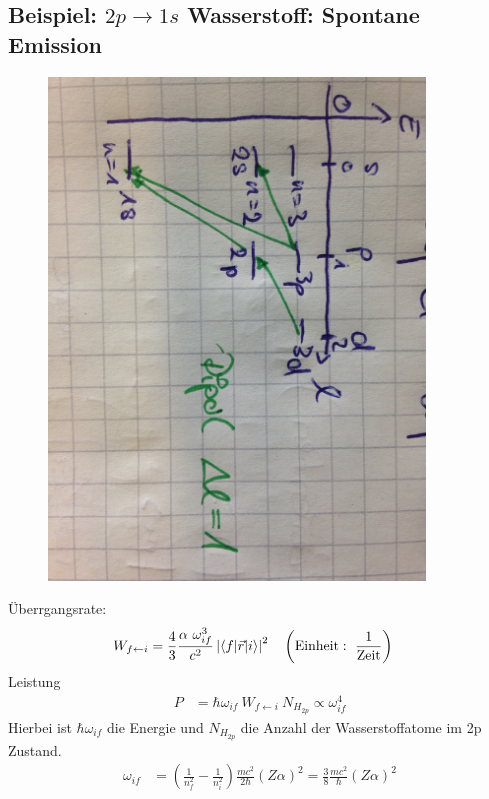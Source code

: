 	\subsection{Beispiel: $2p \rightarrow 1s$ Wasserstoff: Spontane Emission}
		\begin{figure} [h]
			\begin{center}
				\includegraphics[width=10cm]{Bild3.jpg}
			\end{center}
		\end{figure}
	Überrgangsrate:
		\begin{align*}
			W_{f \leftarrow i} &=
			\frac{4}{3} \frac{\alpha ~\omega_{if}^3}{c^2} 
			\left|\braket{f | \vec{r} | i}\right|^2
			& &\left( \text{Einheit}: ~\frac{1}{\text{Zeit}}\right)
		\end{align*}
	Leistung
		\begin{align*}
			P &= \hbar \omega_{if} ~W_{f \leftarrow i} ~N_{H_{2p}} \propto \omega_{if}^4
		\end{align*}
	Hierbei ist $\hbar \omega_{if}$ die Energie und $N_{H_{2p}}$ die Anzahl der Wasserstoffatome im 2p Zustand.
		\begin{align*}
			\omega_{if} &= 
			\left( \frac{1}{n_f^2} - \frac{1}{n_i^2}\right)
			\frac{m c^2}{2 \hbar} \left(Z \alpha\right)^2
			= \frac{3}{8} \frac{m c^2}{\hbar} \left(Z \alpha\right)^2
		\end{align*}
